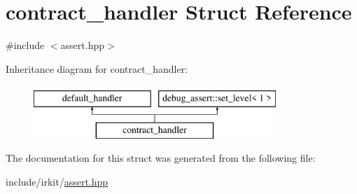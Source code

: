\hypertarget{structcontract__handler}{}\section{contract\+\_\+handler Struct Reference}
\label{structcontract__handler}


{\ttfamily \#include $<$assert.\+hpp$>$}

Inheritance diagram for contract\+\_\+handler\+:\begin{figure}[H]
\begin{center}
\leavevmode
\includegraphics[height=2.000000cm]{structcontract__handler}
\end{center}
\end{figure}


The documentation for this struct was generated from the following file\+:\begin{DoxyCompactItemize}
\item 
include/irkit/\mbox{\hyperlink{assert_8hpp}{assert.\+hpp}}\end{DoxyCompactItemize}
